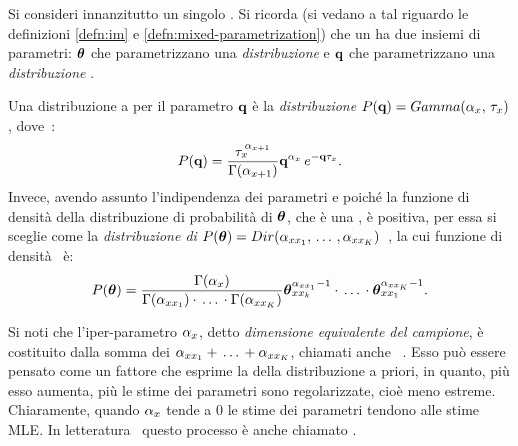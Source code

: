 Si consideri innanzitutto un singolo \mprocess*{}. Si ricorda (si vedano a tal riguardo le definizioni \ref{defn:im} e \ref{defn:mixed-parametrization}) che un \mprocess*{} ha due insiemi di parametri: $\boldsymbol{\textbf{\text{$\theta$}}}$ che parametrizzano una \emph{distribuzione } e $\boldsymbol{\textbf{\text{q}}}$ che parametrizzano una \emph{distribuzione }.

Una distribuzione a  per il parametro $\boldsymbol{\textbf{\text{q}}}$ è la \emph{distribuzione } $P(\boldsymbol{\textbf{\text{q}}})=Gamma(\alpha_{\mathnormal{x}},\,\tau_{\mathnormal{x}})$, dove~\citep[si veda][]{Nodelman2007}:
\begin{equation}\label{eq:ctbn-bayesian-params-gamma}
P(\boldsymbol{\textbf{\text{q}}})=\frac{ \tau_{\mathnormal{x}}^{\,\alpha_{\mathnormal{x}+1}} }{ \Gamma(\alpha_{\mathnormal{x}+1}) } \boldsymbol{\textbf{\text{q}}}^{ \alpha_{\mathnormal{x}} } \, e^{ -\boldsymbol{\textbf{\text{q}}}\tau_{\mathnormal{x}} } \text{.}
\end{equation}
Invece, avendo assunto l'indipendenza dei parametri e poiché la funzione di densità della distribuzione di probabilità di $\boldsymbol{\textbf{\text{$\theta$}}}$, che è una , è positiva, per essa si sceglie come  la \emph{distribuzione di } $P(\boldsymbol{\textbf{\text{$\theta$}}})=Dir(\alpha_{\mathnormal{x}\mathnormal{x}_1},\,\dotsc\,,\alpha_{\mathnormal{x}\mathnormal{x}_K})$~\citep[si veda][]{Heckerman1996,Heckerman1995}, la cui funzione di densità~\citep{Steck2002} è:
\begin{equation}\label{eq:ctbn-bayesian-params-dirichlet}
P(\boldsymbol{\textbf{\text{$\theta$}}})=\frac{ \Gamma(\alpha_{\mathnormal{x}}) }{ \Gamma(\alpha_{\mathnormal{x}\mathnormal{x}_1}) \cdot \,\dotsc\, \cdot \Gamma(\alpha_{\mathnormal{x}\mathnormal{x}_K}) } \boldsymbol{\textbf{\text{$\theta$}}}_{\mathnormal{x}\mathnormal{x}_k}^{\alpha_{\mathnormal{x}\mathnormal{x}_1}-1} \cdot \,\dotsc\, \cdot \boldsymbol{\textbf{\text{$\theta$}}}_{\mathnormal{x}\mathnormal{x}_1}^{\alpha_{\mathnormal{x}\mathnormal{x}_K}-1} \text{.}
\end{equation}
\begin{nota}
Si noti che l'iper-parametro $\alpha_{\mathnormal{x}}$, detto \emph{dimensione equivalente del campione}, è costituito dalla somma dei \emph{} $\alpha_{\mathnormal{x}\mathnormal{x}_1} + \, \dotsc \, + \alpha_{\mathnormal{x}\mathnormal{x}_K}$, chiamati anche \emph{}~\citep{Steck2002}. Esso può essere pensato come un fattore che esprime la \emph{} della distribuzione a priori, in quanto, più esso aumenta, più le stime dei parametri sono regolarizzate, cioè meno estreme. Chiaramente, quando $\alpha_{\mathnormal{x}}$ tende a $0$ le stime dei parametri tendono alle stime \acl{MLE}. In letteratura~\citep[si veda][]{Steck2002} questo processo è anche chiamato \emph{}.
\end{nota}
